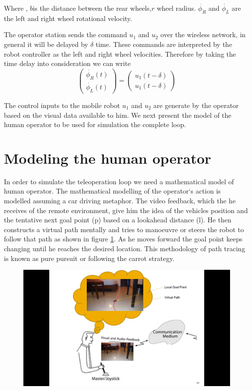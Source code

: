 Where ,  $b$is the distance between the rear wheels,$r$ wheel radius. $\dot{\phi_R}$ and $\dot{\phi_L} $ are the left and right wheel rotational velocity. 

The operator station sends the command $u_1$ and $u_2$ over the wireless network, in general it will be delayed by $\delta$ time. These commands are interpreted by the robot controller as the left and right wheel velocities.  Therefore by taking the time delay into consideration we can write
\begin{equation}
\begin{pmatrix}
\dot{\phi_R}(t) \\
 \dot{\phi_L}(t)
\end{pmatrix}
=
\begin{pmatrix}
u_1(t-\delta)\\
u_1(t-\delta)
\end{pmatrix}
\end{equation}

The control inputs to the mobile robot  $u_1$ and $u_2$ are generate by the operator based on the visual data available to him. We next present the model of the human operator to be used for simulation the complete loop.


\section{Modeling the human operator}
In order to simulate the teleoperation loop we need a mathematical model of human operator. The mathematical  modelling of the operator`s action is modelled assuming a car driving metaphor. The video feedback, which the he receives of the remote environment, give him the idea of the vehicles  position and the tentative next goal point (p) based on a lookahead distance (l). He then constructs a  virtual path mentally and tries to manoeuvre or steers the robot to follow that path as shown in figure \ref{fig:drivingStratagy}. As he moves forward the goal point keeps changing until he reaches the desired location. This methodology of path tracing is known as pure pursuit \cite{coulter1992implementation} or following the carrot strategy. 
\begin{figure}
	\includegraphics[width=\linewidth,keepaspectratio]{Chapter6/fig/mentalMap}
	\label{fig:drivingStratagy} 
\end{figure}

